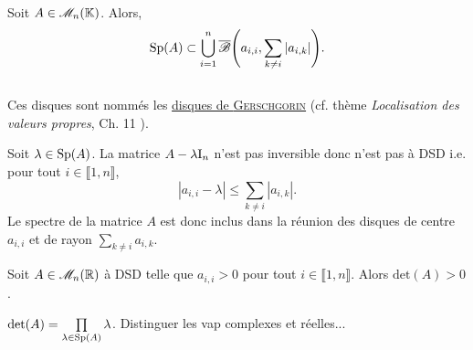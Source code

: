 \begin{marginfigure}
    
\end{marginfigure}

\begin{theo}
    Soit $A \in \mathscr{M}_n(\mathbb{K})$. Alors, $$\mathrm{Sp}(A) \subset \bigcup\limits_{i=1}^{n} \overline{\mathscr{B}} \Bigg( a_{i,i}, \sum\limits_{k \not = i} |a_{i,k}| \Bigg).$$ \\
    Ces disques sont nommés les \href{https://fr.wikipedia.org/wiki/Théorème_de_Gerschgorin}{disques de \textsc{Gerschgorin}} (cf. thème \textit{Localisation des valeurs propres}, Ch. 11 \cite{acamanes}).
\end{theo}

\begin{preuve}
    Soit $\lambda \in \mathrm{Sp}(A)$. La matrice $A - \lambda \mathrm{I}_n$ n'est pas inversible donc n'est pas à DSD i.e. pour tout $i \in \llbracket 1, n \rrbracket$,
    $$|a_{i,i} - \lambda| \leqslant \sum_{k \not= i} |a_{i,k}|.$$
    Le spectre de la matrice $A$ est donc inclus dans la réunion des disques de centre $a_{i,i}$ et de rayon $\sum\limits_{k \not=i} a_{i,k}$.
\end{preuve}    

\begin{prop}
    Soit $A \in \mathscr{M}_n(\mathbb{R})$ à DSD telle que $a_{i,i} > 0$ pour tout $i \in \llbracket 1, n \rrbracket$. Alors $\mathrm{det}(A) > 0$. 
\end{prop}

\begin{preuve}
        $\det(A) = \prod\limits_{\lambda \in \mathrm{Sp}(A)} \lambda$. Distinguer les vap complexes et réelles...
\end{preuve}
